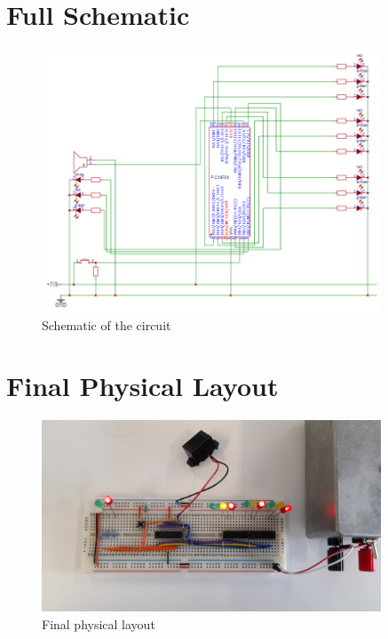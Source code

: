 \chapter{Full Schematic}
\label{chap:schematic}
\begingroup
\let\clearpage\relax

\begin{figure}[H]
    \centering
    \includegraphics[width=0.9\textwidth]{images/Schematic_A-level-microcontroller_2022-03-20.png}
    \caption{Schematic of the circuit}
    \label{fig:fullSchematic}
\end{figure}
\endgroup

\chapter{Final Physical Layout}
\label{chap:finalLayout}

\begin{figure}[H]
    \centering
    \includegraphics[width=0.9\textwidth]{images/final-testing/state_1.jpg}
    \caption{Final physical layout}
    \label{fig:finalPhysicalLayout}
\end{figure}